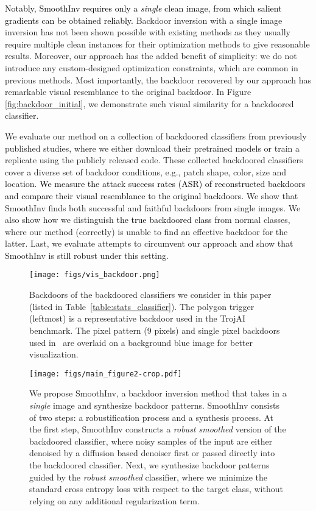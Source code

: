 \documentclass[10pt,twocolumn,letterpaper]{article}
\newcommand{\ms}[1]{\textcolor{black}{#1}}
\begin{document}
\ms{Notably, SmoothInv requires only a \emph{single} clean image, from which salient gradients can be obtained reliably.} Backdoor inversion with a single image inversion has not been shown possible with existing  methods as they usually require multiple clean instances for their optimization methods to give reasonable results. Moreover, our approach has the added benefit of simplicity: we do not introduce any custom-designed optimization constraints, which are common in previous methods. Most importantly, the backdoor recovered by our approach has remarkable visual resemblance to the original backdoor. In Figure \ref{fig:backdoor_initial}, we demonstrate such visual similarity for a backdoored classifier.

We evaluate our method on a collection of backdoored classifiers from previously published studies, where we either download their pretrained models or train a replicate using the publicly released code. These collected backdoored classifiers cover a diverse set of backdoor conditions, e.g., patch shape, color, size and location. \ms{We measure the attack success rates (ASR) of reconstructed backdoors and compare their visual resemblance to the original backdoors.} We show that SmoothInv finds both successful and faithful backdoors from single images. We also show how we distinguish \ms{the true backdoored class} from normal classes, where our method (correctly) is unable to find an effective backdoor for the latter. Last, we evaluate attempts to circumvent our approach and show that SmoothInv is still robust under this setting. 



\begin{figure}[!t]
    \centering
    \texttt{[image: figs/vis\_backdoor.png]}
    \caption{Backdoors of the backdoored classifiers we consider in this paper (listed in Table~\ref{table:stats_classifier}). The polygon trigger (leftmost) is a representative backdoor used in the TrojAI benchmark. The pixel pattern (9 pixels) and single pixel backdoors used in~\cite{bagdasaryan2020blind} are overlaid on a background blue image for better visualization.}
    \label{fig:stats_backdoor}
\end{figure}

\begin{figure*}[!t]
    \centering
    \texttt{[image: figs/main\_figure2-crop.pdf]}
    \caption{We propose SmoothInv, a backdoor inversion method that takes in a \textit{single} image and synthesize backdoor patterns. SmoothInv consists of two steps: a robustification process and a synthesis process. At the first step, SmoothInv constructs a \textit{robust smoothed} version of the backdoored classifier, where noisy samples of the input are either denoised by a diffusion based denoiser first or passed directly into the backdoored classifier. Next, we synthesize backdoor patterns guided by the \textit{robust smoothed} classifier, where we minimize the standard cross entropy loss with respect to the target class, without relying on any additional regularization term.}
    \label{fig:main_figure}
\end{figure*}
\end{document}
